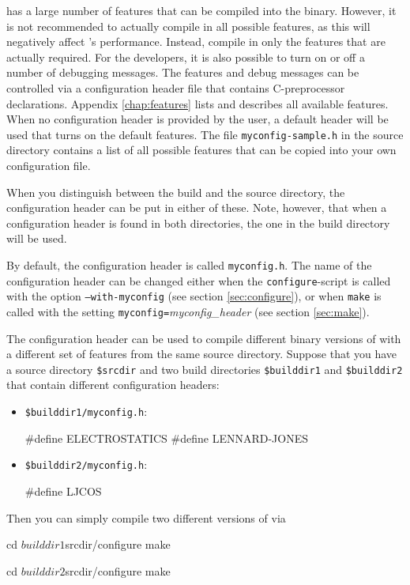    \es
has a large number of features that can be compiled into the binary.
However, it is not recommended to actually compile in all possible
features, as this will negatively affect \es's performance.  Instead,
compile in only the features that are actually required.  For the
developers, it is also possible to turn on or off a number of
debugging messages.  The features and debug messages can be controlled
via a configuration header file that contains C-preprocessor
declarations. Appendix \vref{chap:features} lists and describes all
available features.  When no configuration header is provided by the
user, a default header will be used that turns on the default
features.  The file \texttt{myconfig-sample.h} in the source directory
contains a list of all possible features that can be copied into your
own configuration file.

When you distinguish between the build and the source directory, the
configuration header can be put in either of these. Note, however,
that when a configuration header is found in both directories, the one
in the build directory will be used.

By default, the configuration header is called \texttt{myconfig.h}.
The name of the configuration header can be changed either when the
\texttt{configure}-script is called with the option
\mbox{\texttt{--with-myconfig}} (see section \vref{sec:configure}), or
when \texttt{make} is called with the setting
\mbox{\texttt{myconfig=}\textit{myconfig\_header}} (see section
\vref{sec:make}).

The configuration header can be used to compile different binary
versions of \es with a different set of features from the same source
directory.  Suppose that you have a source directory \texttt{\$srcdir}
and two build directories \texttt{\$builddir1} and
\texttt{\$builddir2} that contain different configuration headers:

\begin{itemize}
\item \texttt{\$builddir1/myconfig.h}:
\begin{code}
#define ELECTROSTATICS
#define LENNARD-JONES
\end{code}

\item \texttt{\$builddir2/myconfig.h}:
\begin{code}
#define LJCOS
\end{code}
\end{itemize}

\noindent Then you can simply compile two different versions of \es via
\begin{code}
cd $builddir1
$srcdir/configure
make

cd $builddir2
$srcdir/configure
make
\end{code}


